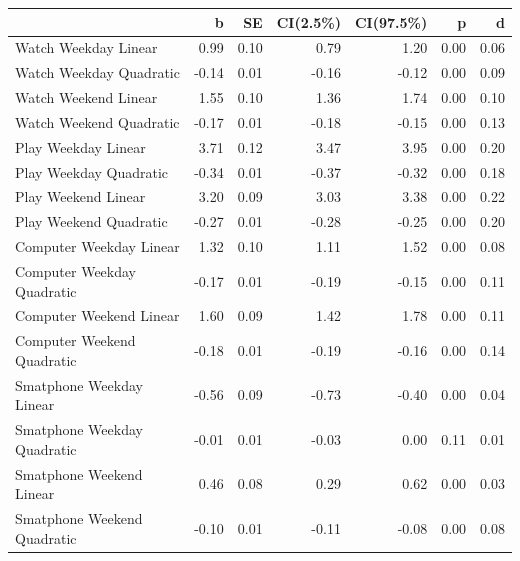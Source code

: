 \documentclass[man]{apa6}
\theoremstyle{definition}
\theoremstyle{definition}
\theoremstyle{definition}
\theoremstyle{remark}
\begin{document}
\begin{tabular}{l|r|r|r|r|r|r}
\hline
  & b & SE & CI(2.5\%) & CI(97.5\%) & p & d\\
\hline
Watch Weekday Linear & 0.99 & 0.10 & 0.79 & 1.20 & 0.00 & 0.06\\
\hline
Watch Weekday Quadratic & -0.14 & 0.01 & -0.16 & -0.12 & 0.00 & 0.09\\
\hline
Watch Weekend Linear & 1.55 & 0.10 & 1.36 & 1.74 & 0.00 & 0.10\\
\hline
Watch Weekend Quadratic & -0.17 & 0.01 & -0.18 & -0.15 & 0.00 & 0.13\\
\hline
Play Weekday Linear & 3.71 & 0.12 & 3.47 & 3.95 & 0.00 & 0.20\\
\hline
Play Weekday Quadratic & -0.34 & 0.01 & -0.37 & -0.32 & 0.00 & 0.18\\
\hline
Play Weekend Linear & 3.20 & 0.09 & 3.03 & 3.38 & 0.00 & 0.22\\
\hline
Play Weekend Quadratic & -0.27 & 0.01 & -0.28 & -0.25 & 0.00 & 0.20\\
\hline
Computer Weekday Linear & 1.32 & 0.10 & 1.11 & 1.52 & 0.00 & 0.08\\
\hline
Computer Weekday Quadratic & -0.17 & 0.01 & -0.19 & -0.15 & 0.00 & 0.11\\
\hline
Computer Weekend Linear & 1.60 & 0.09 & 1.42 & 1.78 & 0.00 & 0.11\\
\hline
Computer Weekend Quadratic & -0.18 & 0.01 & -0.19 & -0.16 & 0.00 & 0.14\\
\hline
Smatphone Weekday Linear & -0.56 & 0.09 & -0.73 & -0.40 & 0.00 & 0.04\\
\hline
Smatphone Weekday Quadratic & -0.01 & 0.01 & -0.03 & 0.00 & 0.11 & 0.01\\
\hline
Smatphone Weekend Linear & 0.46 & 0.08 & 0.29 & 0.62 & 0.00 & 0.03\\
\hline
Smatphone Weekend Quadratic & -0.10 & 0.01 & -0.11 & -0.08 & 0.00 & 0.08\\
\hline
\end{tabular}
\end{document}
